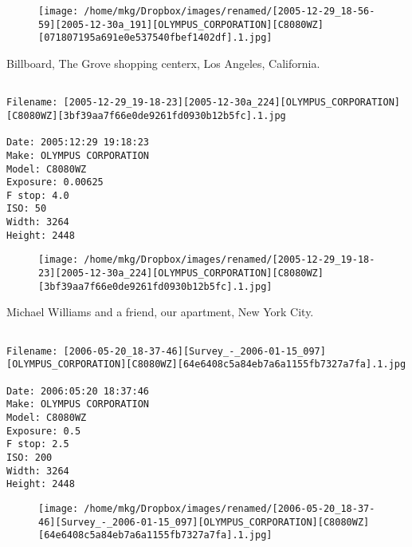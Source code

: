 \begin{figure}
\texttt{[image: /home/mkg/Dropbox/images/renamed/[2005-12-29\_18-56-59][2005-12-30a\_191][OLYMPUS\_CORPORATION][C8080WZ][071807195a691e0e537540fbef1402df].1.jpg]}
\end{figure}
    
\clearpage
\onecolumn
\noindent Billboard, The Grove shopping centerx, Los Angeles, California.
\noindent
\begin{lstlisting}

Filename: [2005-12-29_19-18-23][2005-12-30a_224][OLYMPUS_CORPORATION][C8080WZ][3bf39aa7f66e0de9261fd0930b12b5fc].1.jpg

Date: 2005:12:29 19:18:23
Make: OLYMPUS CORPORATION
Model: C8080WZ
Exposure: 0.00625
F stop: 4.0
ISO: 50
Width: 3264
Height: 2448
\end{lstlisting}
\clearpage

\begin{figure}
\texttt{[image: /home/mkg/Dropbox/images/renamed/[2005-12-29\_19-18-23][2005-12-30a\_224][OLYMPUS\_CORPORATION][C8080WZ][3bf39aa7f66e0de9261fd0930b12b5fc].1.jpg]}
\end{figure}
    
\clearpage
\onecolumn
\noindent Michael Williams and a friend, our apartment, New York City.
\noindent
\begin{lstlisting}

Filename: [2006-05-20_18-37-46][Survey_-_2006-01-15_097][OLYMPUS_CORPORATION][C8080WZ][64e6408c5a84eb7a6a1155fb7327a7fa].1.jpg

Date: 2006:05:20 18:37:46
Make: OLYMPUS CORPORATION
Model: C8080WZ
Exposure: 0.5
F stop: 2.5
ISO: 200
Width: 3264
Height: 2448
\end{lstlisting}
\clearpage

\begin{figure}
\texttt{[image: /home/mkg/Dropbox/images/renamed/[2006-05-20\_18-37-46][Survey\_-\_2006-01-15\_097][OLYMPUS\_CORPORATION][C8080WZ][64e6408c5a84eb7a6a1155fb7327a7fa].1.jpg]}
\end{figure}
    

